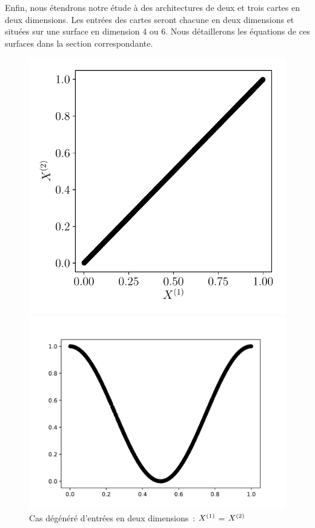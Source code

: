 \documentclass[../main]{subfiles}
\begin{document}
Enfin, nous étendrons notre étude à des architectures de deux et trois cartes en deux dimensions. Les entrées des cartes seront chacune en deux dimensions et situées sur une surface en dimension 4 ou 6. Nous détaillerons les équations de ces surfaces dans la section correspondante.

\begin{figure}
	\begin{minipage}{\textwidth}
		\begin{minipage}{0.33\textwidth}
			\includegraphics[width=\textwidth]{2som_id_in.pdf}
			\caption{Cas dégénéré d'entrées en deux dimensions~: $X^{({1})}$ = $X^{({2})}$ \label{fig:id}}
		\end{minipage}
		\begin{minipage}{0.33\textwidth}
			\includegraphics[width=\textwidth]{2som_courbe000_inputs.pdf}

\end{minipage}
\end{minipage}
\end{figure}
\end{document}
